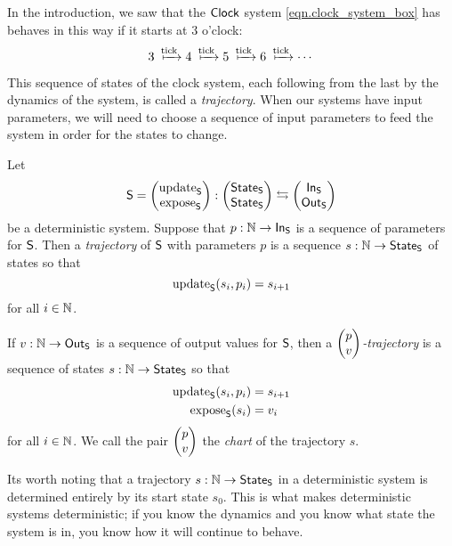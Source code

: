 \documentclass[DynamicalBook]{subfiles}
\begin{document}
In the introduction, we saw that the $\mathsf{Clock}$ system
\cref{eqn.clock_system_box} has behaves in this way if it starts at $3$ o'clock: 
$$3 \xmapsto{\fun{tick}} 4 \xmapsto{\fun{tick}} 5 \xmapsto{\fun{tick}} 6
\xmapsto{\fun{tick}} \cdots$$

This sequence of states of the clock system, each following from the last by the
dynamics of the system, is called a \emph{trajectory}. When our systems have
input parameters, we will need to choose a sequence of input parameters to feed
the system in order for the states to change.

\begin{definition}\label{def.trajectory_discrete}
 Let $$\mathsf{S} = \begin{pmatrix}{\mathrm{update}_{\mathsf{S}}} \\ {\mathrm{expose}_{\mathsf{S}}} \end{pmatrix} : \begin{pmatrix}{\mathsf{State}_{\mathsf{S}}} \\ {\mathsf{State}_{\mathsf{S}}} \end{pmatrix}
 \leftrightarrows \begin{pmatrix}{\mathsf{In}_{\mathsf{S}}} \\ {\mathsf{Out}_{\mathsf{S}}} \end{pmatrix}$$
 be a deterministic system. Suppose that $p : \mathbb{N} \to \mathsf{In}_{\mathsf{S}}$ is a sequence of
 parameters for $\mathsf{S}$. Then a \emph{trajectory} of $\mathsf{S}$ with parameters
 $p$ is a sequence $s : \mathbb{N} \to \mathsf{State}_{\mathsf{S}}$ of states so that
 $$\mathrm{update}_{\mathsf{S}}(s_i, p_i) = s_{i + 1}$$
 for all $i \in \mathbb{N}$.

 If $v : \mathbb{N} \to \mathsf{Out}_{\mathsf{S}}$ is a sequence of output values for $\mathsf{S}$, then a
 \emph{$\begin{pmatrix}{p} \\ {v} \end{pmatrix}$-trajectory} is a sequence of states $s : \mathbb{N} \to \mathsf{State}_{\mathsf{S}}$ so
 that
 \begin{align*}
   \mathrm{update}_{\mathsf{S}}(s_i, p_i) &= s_{i + 1}\\
   \mathrm{expose}_{\mathsf{S}}(s_i) &= v_i
 \end{align*}
 for all $i \in \mathbb{N}$. We call the pair $\begin{pmatrix}{p} \\ {v} \end{pmatrix}$ the \emph{chart} of the trajectory $s$.
\end{definition}

Its worth noting that a trajectory $s : \mathbb{N} \to \mathsf{State}_{\mathsf{S}}$ in a deterministic system is determined
entirely by its start state $s_0$. This is what makes deterministic systems
deterministic; if you know the dynamics and you know what state the system is
in, you know how it will continue to behave. 
\end{document}
